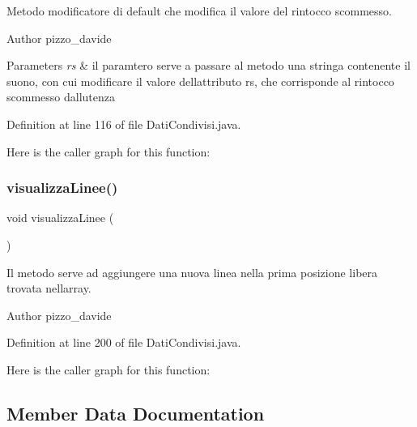 Metodo modificatore di default che modifica il valore del rintocco scommesso. 

\begin{DoxyAuthor}{Author}
pizzo\+\_\+davide
\end{DoxyAuthor}

\begin{DoxyParams}{Parameters}
{\em rs} & il paramtero serve a passare al metodo una stringa contenente il suono, con cui modificare il valore dell\textquotesingle{}attributo rs, che corrisponde al rintocco scommesso dall\textquotesingle{}utenza \\
\hline
\end{DoxyParams}


Definition at line 116 of file Dati\+Condivisi.\+java.

Here is the caller graph for this function\+:
\mbox{\label{classcampane_1_1_dati_condivisi_a7bab9fc262a791bb644c1a11f0c0bc46}} 
\subsubsection{\texorpdfstring{visualizza\+Linee()}{visualizzaLinee()}}
{\footnotesize\ttfamily void visualizza\+Linee (\begin{DoxyParamCaption}{ }\end{DoxyParamCaption})}



Il metodo serve ad aggiungere una nuova linea nella prima posizione libera trovata nell\textquotesingle{}array. 

\begin{DoxyAuthor}{Author}
pizzo\+\_\+davide 
\end{DoxyAuthor}


Definition at line 200 of file Dati\+Condivisi.\+java.

Here is the caller graph for this function\+:


\subsection{Member Data Documentation}
\mbox{\label{classcampane_1_1_dati_condivisi_afcdc45755cdcbdea516dc94b3db2301f}} 
